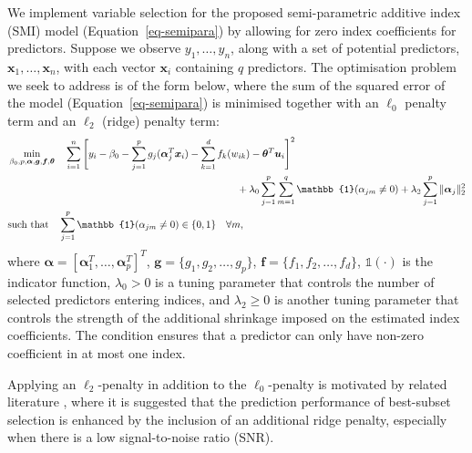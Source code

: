\documentclass[
  11pt,
  a4paper,
]{article}
\begin{document}
We implement variable selection for the proposed semi-parametric
additive index (SMI) model (Equation~\ref{eq-semipara}) by allowing for
zero index coefficients for predictors. Suppose we observe
\(y_1,\dots,y_n\), along with a set of potential predictors,
\(\bm{x}_1,\dots,\bm{x}_n\), with each vector \(\bm{x}_i\) containing
\(q\) predictors. The optimisation problem we seek to address is of the
form below, where the sum of the squared error of the model
(Equation~\ref{eq-semipara}) is minimised together with an \(\ell_{0}\)
penalty term and an \(\ell_{2}\) (ridge) penalty term: \begin{align}
  & \min_{\beta_{0}, p, \bm{\alpha}, \bm{g}, \bm{f}, \bm{\theta}} \quad \sum_{i = 1}^{n}\Bigg [ y_{i} - \beta_{0} - \sum_{j = 1}^{p}g_{j}(\bm{\alpha}_{j}^{T}\bm{x}_{i}) - \sum_{k = 1}^{d}f_{k}(w_{ik}) - \bm{\theta}^{T}\bm{u}_{i}\Bigg]^{2} \label{eq-smi}\\
  & \hspace*{8cm} + \lambda_{0}\sum_{j = 1}^{p}\sum_{m = 1}^{q}\mathbb{1}(\alpha_{jm} \neq 0) + \lambda_{2}\sum_{j = 1}^{p}\|\bm{\alpha}_{j}\|_2^2 \nonumber \\
  & \text{such that}\quad \sum_{j=1}^p \mathbb{1}(\alpha_{jm} \neq 0) \in \{0,1\} \quad \forall m ,\nonumber
\end{align} where
\(\bm{\alpha} = [\bm{\alpha}_{1}^{T}, \dots, \bm{\alpha}_{p}^{T} ]^{T}\),
\(\bm{g} = \{g_{1}, g_{2}, \dots, g_{p}\}\),
\(\bm{f} = \{f_{1}, f_{2}, \dots, f_{d}\}\), \(\mathbb{1}(\cdot)\) is
the indicator function, \(\lambda_{0} > 0\) is a tuning parameter that
controls the number of selected predictors entering indices, and
\(\lambda_{2} \ge 0\) is another tuning parameter that controls the
strength of the additional shrinkage imposed on the estimated index
coefficients. The condition ensures that a predictor can only have
non-zero coefficient in at most one index.

Applying an \(\ell_{2}\)-penalty in addition to the \(\ell_{0}\)-penalty
is motivated by related literature
\autocite{Hazimeh2020,Mazumder2022,Hazimeh2023}, where it is suggested
that the prediction performance of best-subset selection is enhanced by
the inclusion of an additional ridge penalty, especially when there is a
low signal-to-noise ratio (SNR).
\end{document}

